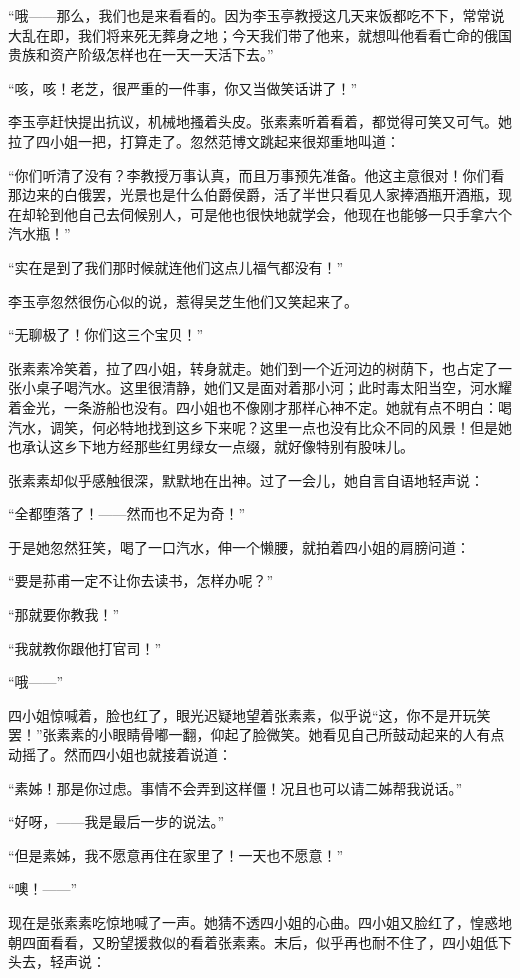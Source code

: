 \par “哦——那么，我们也是来看看的。因为李玉亭教授这几天来饭都吃不下，常常说大乱在即，我们将来死无葬身之地；今天我们带了他来，就想叫他看看亡命的俄国贵族和资产阶级怎样也在一天一天活下去。”
\par “咳，咳！老芝，很严重的一件事，你又当做笑话讲了！”
\par 李玉亭赶快提出抗议，机械地搔着头皮。张素素听着看着，都觉得可笑又可气。她拉了四小姐一把，打算走了。忽然范博文跳起来很郑重地叫道：
\par “你们听清了没有？李教授万事认真，而且万事预先准备。他这主意很对！你们看那边来的白俄罢，光景也是什么伯爵侯爵，活了半世只看见人家捧酒瓶开酒瓶，现在却轮到他自己去伺候别人，可是他也很快地就学会，他现在也能够一只手拿六个汽水瓶！”
\par “实在是到了我们那时候就连他们这点儿福气都没有！”
\par 李玉亭忽然很伤心似的说，惹得吴芝生他们又笑起来了。
\par “无聊极了！你们这三个宝贝！”
\par 张素素冷笑着，拉了四小姐，转身就走。她们到一个近河边的树荫下，也占定了一张小桌子喝汽水。这里很清静，她们又是面对着那小河；此时毒太阳当空，河水耀着金光，一条游船也没有。四小姐也不像刚才那样心神不定。她就有点不明白：喝汽水，调笑，何必特地找到这乡下来呢？这里一点也没有比众不同的风景！但是她也承认这乡下地方经那些红男绿女一点缀，就好像特别有股味儿。
\par 张素素却似乎感触很深，默默地在出神。过了一会儿，她自言自语地轻声说：
\par “全都堕落了！——然而也不足为奇！”
\par 于是她忽然狂笑，喝了一口汽水，伸一个懒腰，就拍着四小姐的肩膀问道：
\par “要是荪甫一定不让你去读书，怎样办呢？”
\par “那就要你教我！”
\par “我就教你跟他打官司！”
\par “哦——”
\par 四小姐惊喊着，脸也红了，眼光迟疑地望着张素素，似乎说“这，你不是开玩笑罢！”张素素的小眼睛骨嘟一翻，仰起了脸微笑。她看见自己所鼓动起来的人有点动摇了。然而四小姐也就接着说道：
\par “素姊！那是你过虑。事情不会弄到这样僵！况且也可以请二姊帮我说话。”
\par “好呀，——我是最后一步的说法。”
\par “但是素姊，我不愿意再住在家里了！一天也不愿意！”
\par “噢！——”
\par 现在是张素素吃惊地喊了一声。她猜不透四小姐的心曲。四小姐又脸红了，惶惑地朝四面看看，又盼望援救似的看着张素素。末后，似乎再也耐不住了，四小姐低下头去，轻声说：
